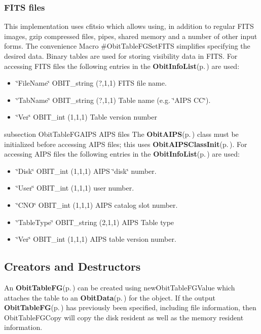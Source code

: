 \subsubsection{FITS files}\label{ObitTableWX_8h_TableFITS}
This implementation uses cfitsio which allows using, in addition to regular FITS images, gzip compressed files, pipes, shared memory and a number of other input forms. The convenience Macro \#Obit\-Table\-FGSet\-FITS simplifies specifying the desired data. Binary tables are used for storing visibility data in FITS. For accessing FITS files the following entries in the {\bf Obit\-Info\-List}{\rm (p.\,\pageref{structObitInfoList})} are used: \begin{itemize}
\item \char`\"{}File\-Name\char`\"{} OBIT\_\-string (?,1,1) FITS file name. \item \char`\"{}Tab\-Name\char`\"{} OBIT\_\-string (?,1,1) Table name (e.g. \char`\"{}AIPS CC\char`\"{}). \item \char`\"{}Ver\char`\"{} OBIT\_\-int (1,1,1) Table version number\end{itemize}
subsection Obit\-Table\-FGAIPS AIPS files The {\bf Obit\-AIPS}{\rm (p.\,\pageref{structObitAIPS})} class must be initialized before accessing AIPS files; this uses {\bf Obit\-AIPSClass\-Init}{\rm (p.\,\pageref{ObitAIPS_8c_a5})}. For accessing AIPS files the following entries in the {\bf Obit\-Info\-List}{\rm (p.\,\pageref{structObitInfoList})} are used: \begin{itemize}
\item \char`\"{}Disk\char`\"{} OBIT\_\-int (1,1,1) AIPS \char`\"{}disk\char`\"{} number. \item \char`\"{}User\char`\"{} OBIT\_\-int (1,1,1) user number. \item \char`\"{}CNO\char`\"{} OBIT\_\-int (1,1,1) AIPS catalog slot number. \item \char`\"{}Table\-Type\char`\"{} OBIT\_\-string (2,1,1) AIPS Table type \item \char`\"{}Ver\char`\"{} OBIT\_\-int (1,1,1) AIPS table version number.\end{itemize}
\subsection{Creators and Destructors}\label{ObitTableFG_8h_ObitTableFGaccess}
An {\bf Obit\-Table\-FG}{\rm (p.\,\pageref{structObitTableFG})} can be created using new\-Obit\-Table\-FGValue which attaches the table to an {\bf Obit\-Data}{\rm (p.\,\pageref{structObitData})} for the object. If the output {\bf Obit\-Table\-FG}{\rm (p.\,\pageref{structObitTableFG})} has previously been specified, including file information, then Obit\-Table\-FGCopy will copy the disk resident as well as the memory resident information.

